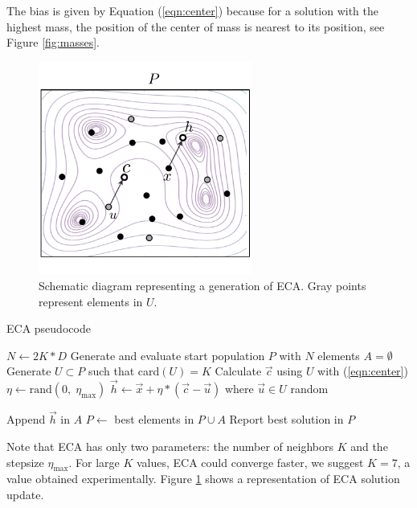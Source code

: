 \documentclass{svproc}
\begin{document}
\begin{note}
The bias is given by Equation (\ref{eqn:center}) because for a solution 
with the highest mass, the position of the center of mass is nearest to 
its position, see Figure \ref{fig:masses}.
\end{note}

\begin{figure}%
	\centering
	\includegraphics[width=7cm]{img/ecaG.pdf}
	\caption{Schematic diagram representing a generation of ECA. Gray points %
	represent elements in $U$.}
	\label{fig:ecag}       %
\end{figure}

\begin{algorithm}%
	\caption{ECA pseudocode}
	\label{algoritmoEca}
	\begin{algorithmic}[1]
		\State $N \gets 2K * D$
		\State Generate and evaluate start population $P$ with $N$ elements
			\State $A = \emptyset$
				\State Generate $U \subset P$ such that  card$(U) = K$
				\State Calculate $\vec{c}$ using $U$ with (\ref{eqn:center})
				\State $\eta \gets \text{rand}(0,\; \eta_{\max}) $ 
				\State $\vec{h} \gets \vec{x} + \eta  * (\vec{c} - \vec{u}) $ where $ \vec{u} \in U $ random
				
					\State Append $\vec{h} $ in $A$
				\EndIf
			\EndFor
			\State $P \gets $ best elements in $P \cup A$
		\EndWhile
		\State Report best solution in $P$
		\EndProcedure
	\end{algorithmic}
\end{algorithm}

Note that ECA  has only two parameters: the number of neighbors $K$ and 
the stepsize $\eta_{\max}$.  For large $K$ values, ECA could converge 
faster, we suggest $K = 7$, a value obtained experimentally. Figure \ref{fig:ecag} 
shows a representation of ECA solution update. 
\end{document}
